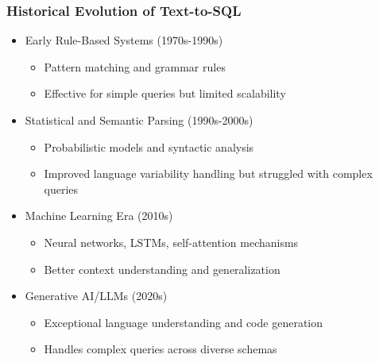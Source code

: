 \begin{frame}\frametitle{Historical Evolution of Text-to-SQL}
      \begin{itemize}
        \item Early Rule-Based Systems (1970s-1990s)
          \begin{itemize}
            \item Pattern matching and grammar rules
            \item Effective for simple queries but limited scalability
          \end{itemize}
        \item Statistical and Semantic Parsing (1990s-2000s)
          \begin{itemize}
            \item Probabilistic models and syntactic analysis
            \item Improved language variability handling but struggled with complex queries
          \end{itemize}
        \item Machine Learning Era (2010s)
          \begin{itemize}
            \item Neural networks, LSTMs, self-attention mechanisms
            \item Better context understanding and generalization
          \end{itemize}
        \item Generative AI/LLMs (2020s)
          \begin{itemize}
            \item Exceptional language understanding and code generation
            \item Handles complex queries across diverse schemas
          \end{itemize}
      \end{itemize}
\end{frame}
